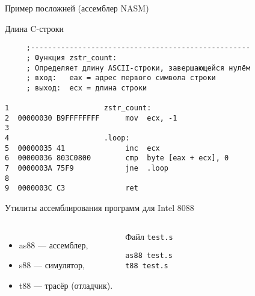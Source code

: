 \begin{frame}[fragile]{Пример посложней (ассемблер NASM)}
\begin{block}{Длина C-строки}
\footnotesize{
\begin{verbatim}
     ;---------------------------------------------------
     ; Функция zstr_count:
     ; Определяет длину ASCII-строки, завершающейся нулём
     ; вход:   eax = адрес первого символа строки
     ; выход:  ecx = длина строки

1                      zstr_count:
2  00000030 B9FFFFFFFF      mov  ecx, -1
3
4                      .loop:
5  00000035 41              inc  ecx
6  00000036 803C0800        cmp  byte [eax + ecx], 0
7  0000003A 75F9            jne  .loop
8
9  0000003C C3              ret
\end{verbatim}}
\end{block}
\end{frame}

\begin{frame}[fragile]{Утилиты ассемблирования программ для Intel 8088}
\begin{columns}
	\column{5cm}
\begin{itemize}
	\item as88 — ассемблер,
	\item s88 — симулятор,
	\item t88 — трасёр (отладчик).
\end{itemize}
\pause
	\column{6cm}
\begin{block}{Файл \texttt{test.s}}
\begin{verbatim}
as88 test.s
t88 test.s
\end{verbatim}
\end{block}
\end{columns}
\end{frame}


